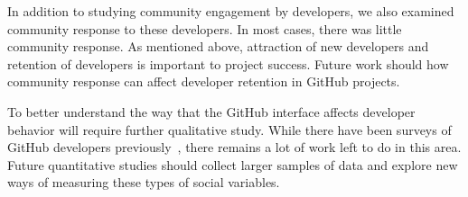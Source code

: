 \documentclass{sigchi}
\begin{document}
In addition to studying community engagement by developers, we also examined
community response to these developers. In most cases, there was little
community response. As mentioned above, attraction of new developers and
retention of developers is important to project success. Future work should how
community response can affect developer retention in GitHub projects.

To better understand the way that the GitHub interface affects developer
behavior will require further qualitative study. While there have been surveys
of GitHub developers previously~\cite{mcdonald_performance_2013}, there remains
a lot of work left to do in this area. Future quantitative studies should
collect larger samples of data and explore new ways of measuring these types of
social variables.

\clearpage


%
%

\appendix

%
%




\end{document}
